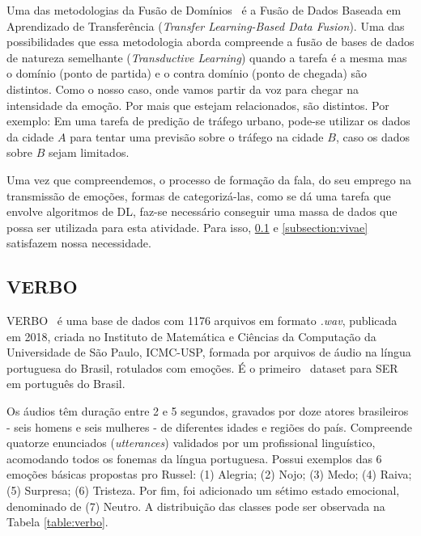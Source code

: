 Uma das metodologias da Fusão de Domínios~\cite{49} é a Fusão de Dados Baseada em Aprendizado de Transferência (\textit{Transfer Learning-Based Data Fusion}). Uma das possibilidades que essa metodologia aborda compreende a fusão de bases de dados de natureza semelhante (\textit{Transductive Learning}) quando a tarefa é a mesma mas o domínio (ponto de partida) e o contra domínio (ponto de chegada) são distintos. Como o nosso caso, onde vamos partir da voz para chegar na intensidade da emoção. Por mais que estejam relacionados, são distintos. Por exemplo: Em uma tarefa de predição de tráfego urbano, pode-se utilizar os dados da cidade $A$ para tentar uma previsão sobre o tráfego na cidade $B$, caso os dados sobre $B$ sejam limitados. 

Uma vez que compreendemos, o processo de formação da fala, do seu emprego na transmissão de emoções, formas de categorizá-las, como se dá uma tarefa que envolve algoritmos de \acrshort{DL}, faz-se necessário conseguir uma massa de dados que possa ser utilizada para esta atividade. Para isso, \ref{subsection:verbo} e \ref{subsection:vivae} satisfazem nossa necessidade.

\subsection{VERBO}\label{subsection:verbo}

\acrlong{VERBO}~\cite{12.21} é uma base de dados com 1176 arquivos em formato \textit{.wav}, publicada em 2018, criada no Instituto de Matemática e Ciências da Computação da Universidade de São Paulo, ICMC-USP, formada por arquivos de áudio na língua portuguesa do Brasil, rotulados com emoções. É o primeiro~\cite{21} dataset para \acrshort{SER} em português do Brasil.

Os áudios têm duração entre 2 e 5 segundos, gravados por doze atores brasileiros - seis homens e seis mulheres - de diferentes idades e regiões do país. Compreende quatorze enunciados (\textit{utterances}) validados por um profissional linguístico, acomodando todos os fonemas da língua portuguesa. Possui exemplos das 6 emoções básicas propostas pro Russel: (1) Alegria; (2) Nojo; (3) Medo; (4) Raiva; (5) Surpresa; (6) Tristeza. Por fim, foi adicionado um sétimo estado emocional, denominado de (7) Neutro. A distribuição das classes pode ser observada na Tabela \ref{table:verbo}.

